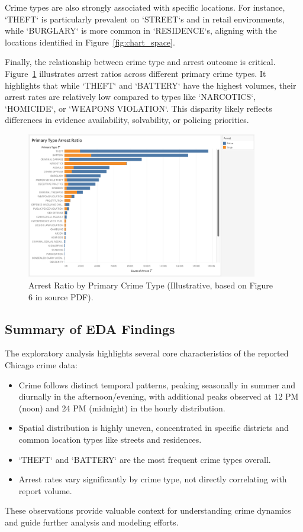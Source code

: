 \documentclass[11pt]{article}
\begin{document}
Crime types are also strongly associated with specific locations. For instance, `THEFT` is particularly prevalent on `STREET`s and in retail environments, while `BURGLARY` is more common in `RESIDENCE`s, aligning with the locations identified in Figure~\ref{fig:chart_space}.

Finally, the relationship between crime type and arrest outcome is critical. Figure~\ref{fig:arrest_ratio} illustrates arrest ratios across different primary crime types. It highlights that while `THEFT` and `BATTERY` have the highest volumes, their arrest rates are relatively low compared to types like `NARCOTICS`, `HOMICIDE`, or `WEAPONS VIOLATION`. This disparity likely reflects differences in evidence availability, solvability, or policing priorities.

\begin{figure}[htbp]
    \centering
    \includegraphics[width=0.9\textwidth]{chart_arrest_ratio.png} %
    \caption{Arrest Ratio by Primary Crime Type (Illustrative, based on Figure 6 in source PDF).}
    \label{fig:arrest_ratio}
\end{figure}

\subsection{Summary of EDA Findings}
\label{subsec:eda_summary}
The exploratory analysis highlights several core characteristics of the reported Chicago crime data:
\begin{itemize}
    \item Crime follows distinct temporal patterns, peaking seasonally in summer and diurnally in the afternoon/evening, with additional peaks observed at 12 PM (noon) and 24 PM (midnight) in the hourly distribution.
    \item Spatial distribution is highly uneven, concentrated in specific districts and common location types like streets and residences.
    \item `THEFT` and `BATTERY` are the most frequent crime types overall.
    \item Arrest rates vary significantly by crime type, not directly correlating with report volume.
\end{itemize}
These observations provide valuable context for understanding crime dynamics and guide further analysis and modeling efforts.
\end{document}
